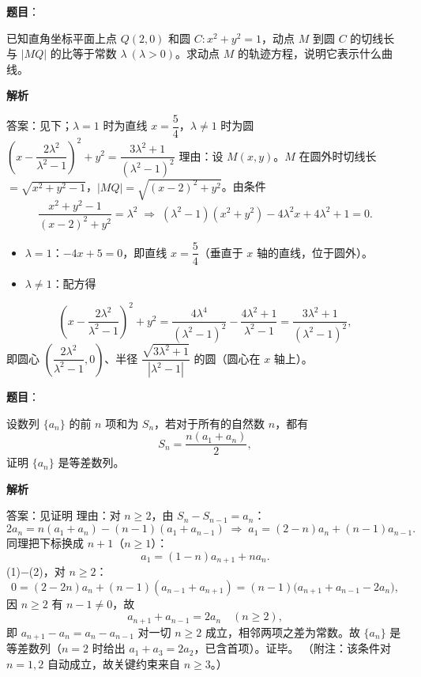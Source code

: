 \begin{answer}

\textbf{题目}：

已知直角坐标平面上点 $Q(2,0)$ 和圆 $C:x^2+y^2=1$，动点 $M$ 到圆 $C$ 的切线长与 $|MQ|$ 的比等于常数 $\lambda\ (\lambda>0)$。求动点 $M$ 的轨迹方程，说明它表示什么曲线。

\textbf{解析}

答案：见下；$\lambda=1$ 时为直线 $x=\dfrac54$，$\lambda\ne1$ 时为圆 $\left(x-\dfrac{2\lambda^2}{\lambda^2-1}\right)^2+y^2=\dfrac{3\lambda^2+1}{(\lambda^2-1)^2}$
理由：设 $M(x,y)$。$M$ 在圆外时切线长 $=\sqrt{x^2+y^2-1}$，$|MQ|=\sqrt{(x-2)^2+y^2}$。由条件
\nopagebreak[4]
\[
\frac{x^2+y^2-1}{(x-2)^2+y^2}=\lambda^2
\;\Longrightarrow\;
(\lambda^2-1)(x^2+y^2)-4\lambda^2x+4\lambda^2+1=0.
\]
\begin{itemize}
\item $\lambda=1$：$-4x+5=0$，即直线 $x=\dfrac54$（垂直于 $x$ 轴的直线，位于圆外）。
\item $\lambda\ne1$：配方得
\end{itemize}
\nopagebreak[4]
\[
\left(x-\frac{2\lambda^2}{\lambda^2-1}\right)^2+y^2=\frac{4\lambda^4}{(\lambda^2-1)^2}-\frac{4\lambda^2+1}{\lambda^2-1}
=\frac{3\lambda^2+1}{(\lambda^2-1)^2},
\]
即圆心 $\left(\dfrac{2\lambda^2}{\lambda^2-1},0\right)$、半径 $\dfrac{\sqrt{3\lambda^2+1}}{|\lambda^2-1|}$ 的圆（圆心在 $x$ 轴上）。


\end{answer}
\begin{answer}

\textbf{题目}：

设数列 $\{a_n\}$ 的前 $n$ 项和为 $S_n$，若对于所有的自然数 $n$，都有
\nopagebreak[4]
\[
S_n=\frac{n(a_1+a_n)}{2},
\]
证明 $\{a_n\}$ 是等差数列。

\textbf{解析}

答案：见证明
理由：对 $n\ge2$，由 $S_n-S_{n-1}=a_n$：
\nopagebreak[4]
\[
2a_n=n(a_1+a_n)-(n-1)(a_1+a_{n-1})
\;\Longrightarrow\;
a_1=(2-n)a_n+(n-1)a_{n-1}.\tag{1}
\]
同理把下标换成 $n+1$（$n\ge1$）：
\nopagebreak[4]
\[
a_1=(1-n)a_{n+1}+n a_n.\tag{2}
\]
(1)$-$(2)，对 $n\ge2$：
\nopagebreak[4]
\[
0=(2-2n)a_n+(n-1)(a_{n-1}+a_{n+1})
=(n-1)\big(a_{n+1}+a_{n-1}-2a_n\big),
\]
因 $n\ge2$ 有 $n-1\ne0$，故
\nopagebreak[4]
\[
a_{n+1}+a_{n-1}=2a_n\quad(n\ge2),
\]
即 $a_{n+1}-a_n=a_n-a_{n-1}$ 对一切 $n\ge2$ 成立，相邻两项之差为常数。故 $\{a_n\}$ 是等差数列（$n=2$ 时给出 $a_1+a_3=2a_2$，已含首项）。证毕。
（附注：该条件对 $n=1,2$ 自动成立，故关键约束来自 $n\ge3$。）


\end{answer}